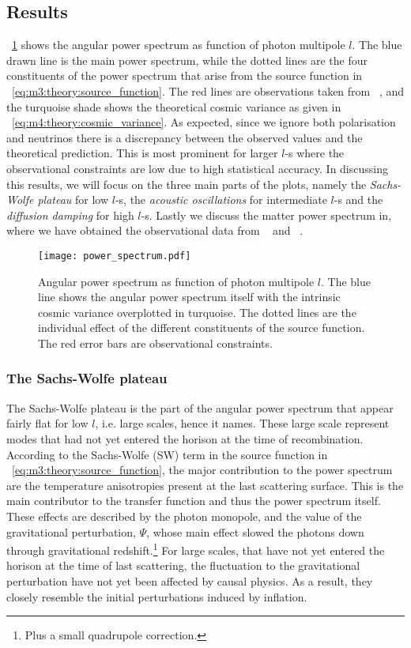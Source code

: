\subsection{Results}\label{sec:m4:results}
    ~\cref{fig:m4:angular_power_spectrum} shows the angular power spectrum as function of photon multipole $l$. The blue drawn line is the main power spectrum, while the dotted lines are the four constituents of the power spectrum that arise from the source function in ~\cref{eq:m3:theory:source_function}. The red lines are observations taken from ~\cite{Planck2020}, and the turquoise shade shows the theoretical cosmic variance as given in ~\cref{eq:m4:theory:cosmic_variance}. As expected, since we ignore both polarisation and neutrinos there is a discrepancy between the observed values and the theoretical prediction. This is most prominent for larger $l$-s where the observational constraints are low due to high statistical accuracy. In discussing this results, we will focus on the three main parts of the plots, namely the \textit{Sachs-Wolfe plateau} for low $l$-s, the \textit{acoustic oscillations} for intermediate $l$-s and the \textit{diffusion damping} for high $l$-s. Lastly we discuss the matter power spectrum in, where we have obtained the observational data from ~\cite{Chabanier_2019} and ~\cite{Hlozek_2012}.
    \begin{figure}
        \texttt{[image: power\_spectrum.pdf]}
        \caption{Angular power spectrum as function of photon multipole $l$. The blue line shows the angular power spectrum itself with the intrinsic cosmic variance overplotted in turquoise. The dotted lines are the individual effect of the different constituents of the source function. The red error bars are observational constraints.}
        \label{fig:m4:angular_power_spectrum}
    \end{figure}
    \subsubsection{The Sachs-Wolfe plateau}
        The Sachs-Wolfe plateau is the part of the angular power spectrum that appear fairly flat for low $l$, i.e. large scales, hence it names. These large scale represent modes that had not yet entered the horison at the time of recombination. According to the Sachs-Wolfe (SW) term in the source function in ~\cref{eq:m3:theory:source_function}, the major contribution to the power spectrum are the temperature anisotropies present at the last scattering surface. This is the main contributor to the transfer function and thus the power spectrum itself. These effects are described by the photon monopole, and the value of the gravitational perturbation, $\Psi$, whose main effect slowed the photons down through gravitational redshift.\footnote{Plus a small quadrupole correction.} For large scales, that have not yet entered the horison at the time of last scattering, the fluctuation to the gravitational perturbation have not yet been affected by causal physics. As a result, they closely resemble the initial perturbations induced by inflation. 

